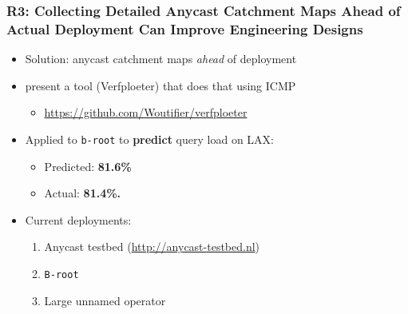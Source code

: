 \documentclass[11pt,show 
notes,notheorems,noamsthm,blank]{beamer} %
\begin{document}
\begin{frame}
 \frametitle{R3: Collecting Detailed Anycast Catchment Maps Ahead of Actual
    Deployment Can Improve Engineering Designs}
    
\begin{itemize}
 \item Solution:  anycast catchment maps \textit{ahead } of deployment

 \item \cite{Vries17b} present a tool (Verfploeter) that does that using ICMP
 \begin{itemize}
  \item \small \url{https://github.com/Woutifier/verfploeter}
 \end{itemize}


 \item Applied to  \texttt{b-root} to \textbf{predict} query load on LAX:
 
 \begin{itemize}
  \item Predicted: \textbf{81.6\% }
  \item Actual: \textbf{81.4\%.}
 \end{itemize}

 

\item Current deployments:

\begin{enumerate}
 \item Anycast testbed (\url{http://anycast-testbed.nl})
 \item \texttt{B-root}
 \item Large unnamed operator
\end{enumerate}


% 
%  
\end{itemize}


    
\end{frame}
\end{document}
